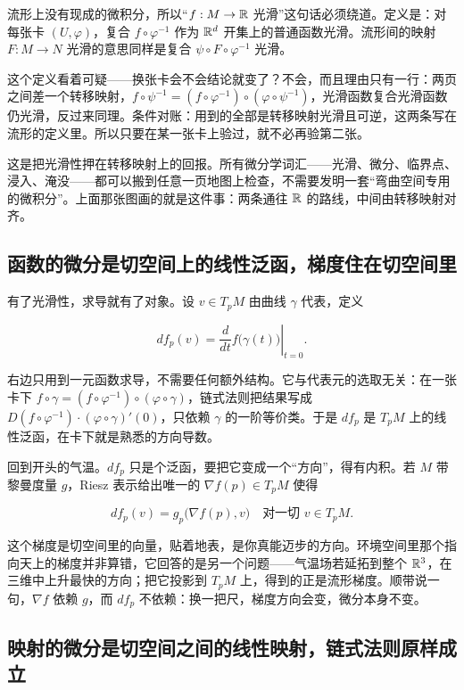 流形上没有现成的微积分，所以``\(f:M\to\mathbb{R}\) 光滑''这句话必须绕道。定义是：对每张卡 \((U,\varphi)\)，复合 \(f\circ\varphi^{-1}\) 作为 \(\mathbb{R}^{d}\) 开集上的普通函数光滑。流形间的映射 \(F:M\to N\) 光滑的意思同样是复合 \(\psi\circ F\circ\varphi^{-1}\) 光滑。

这个定义看着可疑——换张卡会不会结论就变了？不会，而且理由只有一行：两页之间差一个转移映射，\(f\circ\psi^{-1}=(f\circ\varphi^{-1})\circ(\varphi\circ\psi^{-1})\)，光滑函数复合光滑函数仍光滑，反过来同理。条件对账：用到的全部是转移映射光滑且可逆，这两条写在流形的定义里。所以只要在某一张卡上验过，就不必再验第二张。

这是把光滑性押在转移映射上的回报。所有微分学词汇——光滑、微分、临界点、浸入、淹没——都可以搬到任意一页地图上检查，不需要发明一套``弯曲空间专用的微积分''。上面那张图画的就是这件事：两条通往 \(\mathbb{R}\) 的路线，中间由转移映射对齐。

\subsection{函数的微分是切空间上的线性泛函，梯度住在切空间里}

有了光滑性，求导就有了对象。设 \(v\in T_{p}M\) 由曲线 \(\gamma\) 代表，定义

\[
df_{p}(v)=\left.\frac{d}{dt}f\bigl(\gamma(t)\bigr)\right|_{t=0}.
\]

右边只用到一元函数求导，不需要任何额外结构。它与代表元的选取无关：在一张卡下 \(f\circ\gamma=(f\circ\varphi^{-1})\circ(\varphi\circ\gamma)\)，链式法则把结果写成 \(D(f\circ\varphi^{-1})\cdot(\varphi\circ\gamma)'(0)\)，只依赖 \(\gamma\) 的一阶等价类。于是 \(df_{p}\) 是 \(T_{p}M\) 上的线性泛函，在卡下就是熟悉的方向导数。

回到开头的气温。\(df_{p}\) 只是个泛函，要把它变成一个``方向''，得有内积。若 \(M\) 带黎曼度量 \(g\)，Riesz 表示给出唯一的 \(\nabla f(p)\in T_{p}M\) 使得

\[
df_{p}(v)=g_{p}\bigl(\nabla f(p),v\bigr)\quad\text{对一切 } v\in T_{p}M.
\]

这个梯度是切空间里的向量，贴着地表，是你真能迈步的方向。环境空间里那个指向天上的梯度并非算错，它回答的是另一个问题——气温场若延拓到整个 \(\mathbb{R}^{3}\)，在三维中上升最快的方向；把它投影到 \(T_{p}M\) 上，得到的正是流形梯度。顺带说一句，\(\nabla f\) 依赖 \(g\)，而 \(df_{p}\) 不依赖：换一把尺，梯度方向会变，微分本身不变。

\subsection{映射的微分是切空间之间的线性映射，链式法则原样成立}

